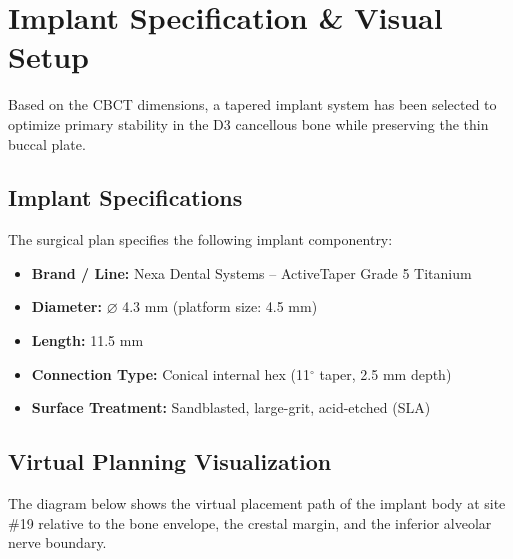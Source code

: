 \section{Implant Specification \& Visual Setup}

Based on the CBCT dimensions, a tapered implant system has been selected to optimize primary stability in the D3 cancellous bone while preserving the thin buccal plate.

\subsection{Implant Specifications}
The surgical plan specifies the following implant componentry:
\begin{itemize}
    \item \textbf{Brand / Line:} Nexa Dental Systems -- ActiveTaper Grade 5 Titanium
    \item \textbf{Diameter:} $\varnothing$ 4.3 mm (platform size: 4.5 mm)
    \item \textbf{Length:} 11.5 mm
    \item \textbf{Connection Type:} Conical internal hex (11$^\circ$ taper, 2.5 mm depth)
    \item \textbf{Surface Treatment:} Sandblasted, large-grit, acid-etched (SLA)
\end{itemize}

\subsection{Virtual Planning Visualization}
The diagram below shows the virtual placement path of the implant body at site \#19 relative to the bone envelope, the crestal margin, and the inferior alveolar nerve boundary.

